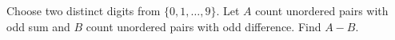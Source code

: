 Choose two distinct digits from $\{0,1,\ldots,9\}$. Let $A$ count unordered pairs with odd sum and $B$ count unordered pairs with odd difference. Find $A-B$.
